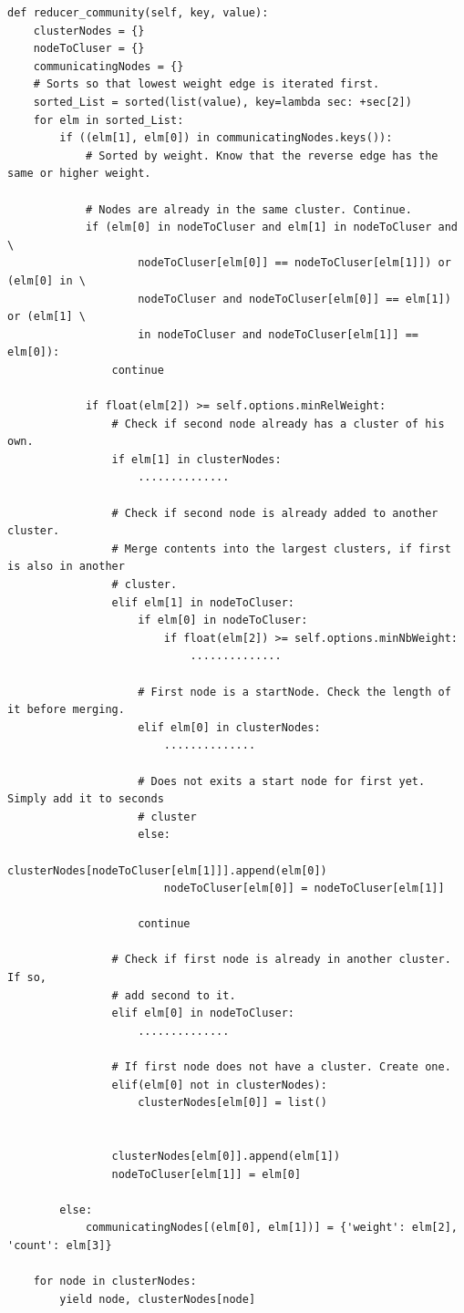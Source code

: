 \documentclass[runningheads,a4paper]{llncs}
\begin{document}
\begin{verbatim}
def reducer_community(self, key, value):
    clusterNodes = {}
    nodeToCluser = {}
    communicatingNodes = {}
    # Sorts so that lowest weight edge is iterated first.
    sorted_List = sorted(list(value), key=lambda sec: +sec[2])
    for elm in sorted_List:
        if ((elm[1], elm[0]) in communicatingNodes.keys()):
            # Sorted by weight. Know that the reverse edge has the same or higher weight.

            # Nodes are already in the same cluster. Continue.
            if (elm[0] in nodeToCluser and elm[1] in nodeToCluser and \
                    nodeToCluser[elm[0]] == nodeToCluser[elm[1]]) or (elm[0] in \
                    nodeToCluser and nodeToCluser[elm[0]] == elm[1]) or (elm[1] \
                    in nodeToCluser and nodeToCluser[elm[1]] == elm[0]):
                continue

            if float(elm[2]) >= self.options.minRelWeight:
                # Check if second node already has a cluster of his own.
                if elm[1] in clusterNodes:
                    ..............

                # Check if second node is already added to another cluster.
                # Merge contents into the largest clusters, if first is also in another
                # cluster.
                elif elm[1] in nodeToCluser:
                    if elm[0] in nodeToCluser:
                        if float(elm[2]) >= self.options.minNbWeight:
                            ..............

                    # First node is a startNode. Check the length of it before merging.
                    elif elm[0] in clusterNodes:
                        ..............

                    # Does not exits a start node for first yet. Simply add it to seconds
                    # cluster
                    else:
                        clusterNodes[nodeToCluser[elm[1]]].append(elm[0])
                        nodeToCluser[elm[0]] = nodeToCluser[elm[1]]

                    continue

                # Check if first node is already in another cluster. If so,
                # add second to it.
                elif elm[0] in nodeToCluser:
                    ..............

                # If first node does not have a cluster. Create one.
                elif(elm[0] not in clusterNodes):
                    clusterNodes[elm[0]] = list()


                clusterNodes[elm[0]].append(elm[1])
                nodeToCluser[elm[1]] = elm[0]

        else:
            communicatingNodes[(elm[0], elm[1])] = {'weight': elm[2], 'count': elm[3]}

    for node in clusterNodes:
        yield node, clusterNodes[node]

\end{verbatim}
\end{document}
